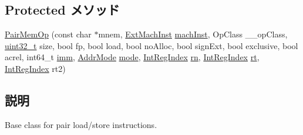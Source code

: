 \subsection*{Protected メソッド}
\begin{DoxyCompactItemize}
\item 
\hyperlink{classArmISA_1_1PairMemOp_a5bba341210b26c5e58c4672b264c3e1a}{PairMemOp} (const char $\ast$mnem, \hyperlink{classStaticInst_a5605d4fc727eae9e595325c90c0ec108}{ExtMachInst} \hyperlink{classStaticInst_a744598b194ca3d4201d9414ce4cc4af4}{machInst}, OpClass \_\-\_\-opClass, \hyperlink{Type_8hh_a435d1572bf3f880d55459d9805097f62}{uint32\_\-t} size, bool fp, bool load, bool noAlloc, bool signExt, bool exclusive, bool acrel, int64\_\-t \hyperlink{namespaceArmISA_a2308526fcc9af84548a72f9ba3102ec1}{imm}, \hyperlink{classArmISA_1_1PairMemOp_abf132b4ad93f3557cd3956577592ba68}{AddrMode} \hyperlink{namespaceArmISA_a5f3b9b97eb2dfa29d33e74878455f90d}{mode}, \hyperlink{namespaceArmISA_ae64680ba9fb526106829d6bf92fc791b}{IntRegIndex} \hyperlink{namespaceArmISA_adf8c6c579ad8729095a637a4f2181211}{rn}, \hyperlink{namespaceArmISA_ae64680ba9fb526106829d6bf92fc791b}{IntRegIndex} \hyperlink{namespaceArmISA_a445689c4b952c722ae5b0cec0311cd10}{rt}, \hyperlink{namespaceArmISA_ae64680ba9fb526106829d6bf92fc791b}{IntRegIndex} rt2)
\end{DoxyCompactItemize}


\subsection{説明}
Base class for pair load/store instructions. 

